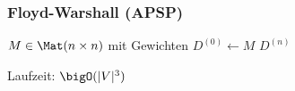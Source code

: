 \subsubsection*{Floyd-Warshall (APSP)}
\begin{algorithm}[H]
	$M \in \Mat(n\times n)$ mit Gewichten\;
	$D^{(0)} \gets M$\;
	\KwRet $D^{(n)}$\;
\end{algorithm}
Laufzeit: $\bigO(|V|^3)$
